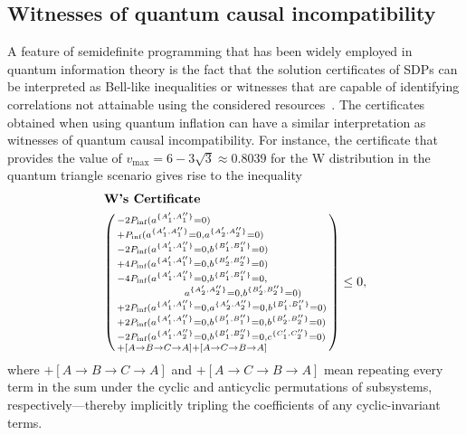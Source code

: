 \documentclass[superscriptaddress,aps,prx,nofootinbib,twocolumn,twoside,reprint,letterpaper,longbibliography]{revtex4-2}
\begin{document}
\subsection{Witnesses of quantum causal incompatibility}\label{sec:witness}
A feature of semidefinite programming that has been widely employed in quantum information theory is the fact that the solution certificates of SDPs can be interpreted as Bell-like inequalities or witnesses that are capable of identifying correlations not attainable using the considered resources~\cite{npa2,baccari2017classical}.
The certificates obtained when using quantum inflation can have a similar interpretation as witnesses of quantum causal incompatibility.
For instance, the certificate that provides the value of ${v_\text{max}=6-3\sqrt{3}\approx 0.8039}$ for the W distribution in the quantum triangle scenario gives rise to the inequality
\begin{align}
\nonumber&\textbf{W's Certificate}\\
&\begin{psmallmatrix*}[l]
		-2P_\text{inf}(a^{\{A'_1,A''_1\}}{=}0) \\
		 + P_\text{inf}(a^{\{A'_1,A''_1\}}{=}0,a^{\{A'_2,A''_2\}}{=}0) \\
		 - 2 P_\text{inf}(a^{\{A'_1,A''_1\}}{=}0,b^{\{B'_1,B''_1\}}{=}0) \\
		+ 4 P_\text{inf}(a^{\{A'_1,A''_1\}}{=}0,b^{\{B'_2,B''_2\}}{=}0) \\
		- 4 P_\text{inf}(a^{\{A'_1,A''_1\}}{=}0,b^{\{B'_1,B''_1\}}{=}0, \\
		\hskip 1.87cm a^{\{A'_2,A''_2\}}{=}0,b^{\{B'_2,B''_2\}}{=}0) \\
		 + 2 P_\text{inf}(a^{\{A'_1,A''_1\}}{=}0,a^{\{A'_2,A''_2\}}{=}0,b^{\{B'_1,B''_1\}}{=}0) \\
		+ 2 P_\text{inf}(a^{\{A'_1,A''_1\}}{=}0,b^{\{B'_1,B''_1\}}{=}0,b^{\{B'_2,B''_2\}}{=}0) \\
		 - 2 P_\text{inf}(a^{\{A'_1,A''_2\}}{=}0,b^{\{B'_1,B''_2\}}{=}0,c^{\{C'_1,C''_2\}}{=}0) \\
		 + [A\rightarrow B\rightarrow C\rightarrow A] + [A\rightarrow C\rightarrow B\rightarrow A]
		\end{psmallmatrix*} \leq 0,
    \label{eq:Wcert}
\end{align}
where ${+[A\rightarrow B\rightarrow C\rightarrow A]}$ and ${+[A\rightarrow C\rightarrow B\rightarrow A]}$ mean repeating every term in the sum under the cyclic and anticyclic permutations of subsystems, respectively---thereby implicitly tripling the coefficients of any cyclic-invariant terms.
\end{document}
